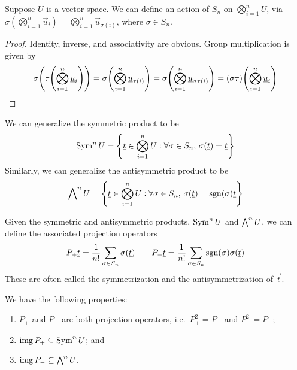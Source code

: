 \begin{lemma}
    Suppose \(U\) is a vector space.
    We can define an action of \(S_n\) on \(\bigotimes_{i=1}^n U\),
    via \(\sigma(\bigotimes_{i=1}^n \vec{u}_i) = \bigotimes_{i=1}^n \vec{u}_{\sigma(i)}\),
    where \(\sigma \in S_n\).
\end{lemma}
\begin{proof}
    Identity, inverse, and associativity are obvious.
    Group multiplication is given by
    \begin{equation*}
        \sigma\pqty{\tau\pqty{\bigotimes_{i=1}^n \vec{u}_i}}
        = \sigma\pqty{\bigotimes_{i=1}^n \vec{u}_{\tau(i)}}
        = \sigma\pqty{\bigotimes_{i=1}^n \vec{u}_{\sigma\tau(i)}}
        = (\sigma\tau)\pqty{\bigotimes_{i=1}^n \vec{u}_i}
    \end{equation*}
\end{proof}
\begin{definition}
    We can generalize the symmetric product to be
    \begin{equation*}
        \Sym^n U = \Bqty{\vec{t} \in \bigotimes_{i=1}^n U: \forall\sigma \in S_n,\,\sigma(\vec{t}) = \vec{t}}
    \end{equation*}
    Similarly, we can generalize the antisymmetric product to be
    \begin{equation*}
        \Asym^n U = \Bqty{\vec{t} \in \bigotimes_{i=1}^n U: \forall\sigma \in S_n,\,\sigma(\vec{t}) = \sgn(\sigma)\vec{t}}
    \end{equation*}
\end{definition}
\begin{definition}
    Given the symmetric and antisymmetric products, \(\operatorname{Sym}^n U\) and \(\operatorname{{\bigwedge}}^n U\),
    we can define the associated projection operators
    \begin{equation*}
        P_+\underline{t} = \frac{1}{n!} \sum_{\sigma \in S_n} \sigma(\underline{t}) \qquad
        P_-\underline{t} = \frac{1}{n!} \sum_{\sigma \in S_n} \operatorname{sgn}(\sigma) \sigma(\underline{t})
    \end{equation*}
    These are often called the symmetrization and the antisymmetrization of \(\vec{t}\).
\end{definition}
\begin{proposition}\label{prop:symmetrization-prop}
    We have the following properties:
    \begin{enumerate}[label={(\alph*)}, itemsep=0mm]
        \item \(P_+\) and \(P_-\) are both projection operators,
            i.e.\ \(P_+^2 = P_+\) and \(P_-^2 = P_-\);
        \item \(\operatorname{img} P_+ \subseteq \operatorname{Sym}^n U\); and
        \item \(\operatorname{img} P_- \subseteq \operatorname{{\bigwedge}}^n U\).
    \end{enumerate}
\end{proposition}
